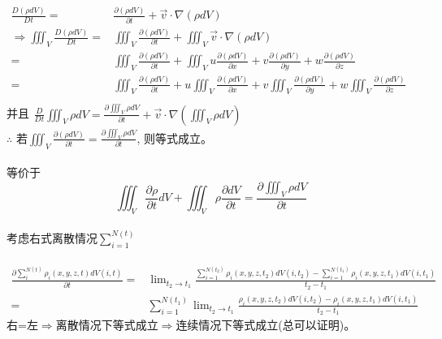 \documentclass[a4paper,11pt,UTF8]{article}%
\theoremstyle{plain}
\begin{document}
		$\begin{aligned}
					\frac{D\left(\rho dV\right)}{Dt}=&\frac{\partial\left(\rho dV\right)}{\partial t}+\overrightarrow{v}\cdot\nabla\left(\rho dV\right)\\
			\Rightarrow\iiint_{V}\frac{D\left(\rho dV\right)}{D t}=&\iiint_{V}\frac{\partial \left(\rho dV\right)}{\partial t}+\iiint_{V}\overrightarrow{v}\cdot\nabla\left(\rho dV\right)\\
			=&\iiint_{V}\frac{\partial \left(\rho dV\right)}{\partial t}+\iiint_{V}u\frac{\partial \left(\rho dV\right)}{\partial x}+v\frac{\partial \left(\rho dV\right)}{\partial y}+w\frac{\partial \left(\rho dV\right)}{\partial z}\\
			=&\iiint_{V}\frac{\partial \left(\rho dV\right)}{\partial t}+u\iiint_{V}\frac{\partial \left(\rho dV\right)}{\partial x}+v\iiint_{V}\frac{\partial \left(\rho dV\right)}{\partial y}+w\iiint_{V}\frac{\partial \left(\rho dV\right)}{\partial z}\\
		\end{aligned}$\\
	并且$\begin{aligned}
		\frac{D}{Dt}\iiint_{V}\rho dV=\frac{\partial \iiint_V\rho dV}{\partial t}+\overrightarrow{v}\cdot\nabla\left(\iiint_V\rho dV\right)
	\end{aligned}$\\
	\clearpage
	\noindent $\therefore$ 若$\iiint_V\frac{\partial \left(\rho dV\right)}{\partial t}=\frac{\partial \iiint_V\rho dV}{\partial t}$, 则等式成立。\\
	~\\
	等价于$$\iiint_V\frac{\partial \rho}{\partial t}dV+\iiint_V\rho\frac{\partial dV}{\partial t}=\frac{\partial \iiint_V\rho dV}{\partial t}$$\\
	考虑右式离散情况$\sum_{i=1}^{N\left(t\right)}$\\
	~\\
	$\begin{aligned}
	\frac{\partial \sum_{i}^{N\left(t\right)}\rho_i\left(x,y,z,t\right)dV\left(i,t\right)}{\partial t}=&\lim_{t_2\to t_1}\frac{\sum_{i=1}^{N\left(t_2\right)}\rho_i\left(x,y,z,t_2\right)dV\left(i,t_2\right)-\sum_{i=1}^{N\left(t_1\right)}\rho_i\left(x,y,z,t_1\right)dV\left(i,t_1\right)}{t_2-t_1}\\
	=&\sum_{i=1}^{N\left(t_1\right)}\lim_{t_2\to t_1}\frac{\rho_i\left(x,y,z,t_2\right)dV\left(i,t_2\right)-\rho_i\left(x,y,z,t_1\right)dV\left(i,t_1\right)}{t_2-t_1}
	\end{aligned}$\\
	右=左$\Rightarrow$离散情况下等式成立$\Rightarrow$连续情况下等式成立(总可以证明)。\\
	
\end{document}
